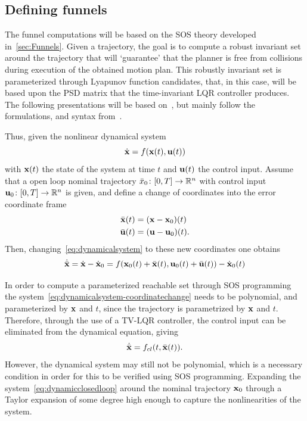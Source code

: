 \subsection{Defining funnels}

The funnel computations will be based on the \ac{SOS} theory developed
in~\cref{sec:Funnels}. Given a trajectory, the goal is to compute a robust
invariant set around the trajectory that will `guarantee' that the planner is
free from collisions during execution of the obtained motion plan. This robustly
invariant set is parameterized through Lyapunov function candidates, that, in
this case, will be based upon the \ac{PSD} matrix that the time-invariant
\ac{LQR} controller produces. The following presentations will be based
on~\cite{Tobenkin_2011, tedrakeLQRtreesFeedbackMotion2009,
  majumdarRobustOnlineMotion2013}, but mainly follow the formulations, and
syntax from~\cite{majumdarFunnelLibrariesRealtime2017}.

Thus, given the nonlinear dynamical system
\begin{equation}
  \label{eq:dynamicalsystem}
  \dot{\mathbf{x}} = f(\mathbf{x}(t), \mathbf{u}(t))
\end{equation}
with \(\mathbf{x}(t)\) the state of the system at time \(t\) and \(\mathbf{u}(t)\)
the control input. Assume that a open loop nominal trajectory \(\bar{x}_0 \colon
[0,T] \rightarrow \mathbb{R}^n\) with control input \(\mathbf{u}_0 \colon [0,T]
\rightarrow \mathbb{R}^n\) is given, and define a change of coordinates into the error
coordinate frame
\begin{align}
  \bar{\mathbf{x}}(t) &= (\mathbf{x} - \mathbf{x}_0)(t) \\
  \bar{\mathbf{u}}(t) &= (\mathbf{u} - \mathbf{u}_0)(t).
\end{align}
Then, changing~\cref{eq:dynamicalsystem} to these new coordinates one obtains
\begin{equation}
  \label{eq:dynamicalsystem-coordinatechange}
  \dot{\bar{\mathbf{x}}} = \dot{\mathbf{x}} - \dot{\mathbf{x}}_0 = f(\mathbf{x}_0(t) + \bar{\mathbf{x}}(t), \mathbf{u}_0(t) + \bar{\mathbf{u}}(t)) - \dot{\mathbf{x}}_0(t)
\end{equation}

In order to compute a parameterized reachable set through \ac{SOS} programming
the system~\cref{eq:dynamicalsystem-coordinatechange} needs to be polynomial,
and parameterized by \(\mathbf{x}\) and \(t\), since the trajectory is
parametrized by \(\mathbf{x}\) and \(t\). Therefore, through the use of a
\ac{TV-LQR} controller, the control input can be eliminated from the dynamical
equation, giving
\begin{equation}
  \label{eq:dynamicclosedloop}
  \dot{\bar{\mathbf{x}}} = f_{cl}(t,\bar{\mathbf{x}}(t)).
\end{equation}
However, the dynamical system may still not be polynomial, which is a necessary
condition in order for this to be verified using \ac{SOS} programming. Expanding
the system~\cref{eq:dynamicclosedloop} around the nominal trajectory
\(\mathbf{x}_0\) through a Taylor expansion of some degree high enough to capture
the nonlinearities of the system.

